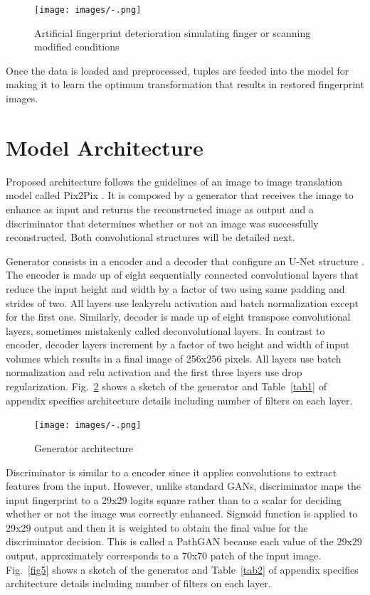 \documentclass[a4paper,fleqn]{cas-dc}
\begin{document}
\begin{figure}[htbp]
\centerline{\texttt{[image: images/-.png]}}
\caption{Artificial fingerprint deterioration simulating finger or scanning modified conditions}
\label{fig3}
\end{figure}

Once the data is loaded and preprocessed, tuples are feeded into the model for making it to learn the optimum transformation that results in restored fingerprint images.

\section{Model Architecture}
\label{sec:MA}

Proposed architecture follows the guidelines of an image to image translation model called Pix2Pix \hyperref[sec:ref3]{\cite{b3}}. It is composed by a generator that receives the image to enhance as input and returns the reconstructed image as output and a discriminator that determines whether or not an image was successfully reconstructed. Both convolutional structures will be detailed next.

Generator consists in a encoder and a decoder that configure an U-Net structure \hyperref[sec:ref4]{\cite{b4}}. The encoder is made up of eight sequentially connected convolutional layers that reduce the input height and width by a factor of two using same padding and strides of two. All layers use leakyrelu activation and batch normalization except for the first one. Similarly, decoder is made up of eight transpose convolutional layers, sometimes mistakenly called deconvolutional layers. In contrast to encoder, decoder layers increment by a factor of two height and width of input volumes which results in a final image of 256x256 pixels. All layers use batch normalization and relu activation and the first three layers use drop regularization. Fig.~\ref{fig4} shows a sketch of the generator and Table~\ref{tab1} of appendix specifies architecture details including number of filters on each layer.

\begin{figure}[htbp]
\centerline{\texttt{[image: images/-.png]}}
\caption{Generator architecture}
\label{fig4}
\end{figure}

Discriminator is similar to a encoder since it applies convolutions to extract features from the input. However, unlike standard GANs, discriminator maps the input fingerprint to a 29x29 logits square rather than to a scalar for deciding whether or not the image was correctly enhanced. Sigmoid function is applied to 29x29 output and then it is weighted to obtain the final value for the discriminator decision. This is called a PathGAN because each value of the 29x29 output, approximately corresponds to a 70x70 patch of the input image. Fig.~\ref{fig5} shows a sketch of the generator and Table~\ref{tab2} of appendix specifies architecture details including number of filters on each layer.
\end{document}
